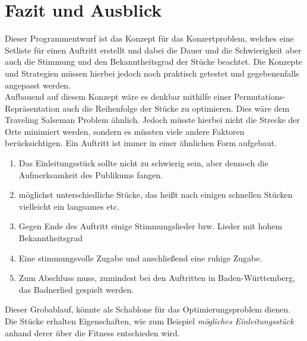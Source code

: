\section{Fazit und Ausblick}\label{sec:fazit}
Dieser Programmentwurf ist das Konzept für das Konzertproblem, welches 
eine Setliste für einen Auftritt erstellt und dabei die Dauer und die Schwierigkeit 
aber auch die Stimmung und den Bekanntheitsgrad der Stücke beachtet. 
Die Konzepte und Strategien müssen hierbei jedoch noch praktisch getestet und 
gegebenenfalls angepasst werden. \\
Aufbauend auf diesem Konzept wäre es denkbar mithilfe einer Permutations-Repräsentation 
auch die Reihenfolge der Stücke zu optimieren. Dies wäre dem Traveling Salseman Problem
ähnlich. Jedoch müsste hierbei nicht die Strecke der Orte minimiert werden, sondern es müssten 
viele andere Faktoren berücksichtigen. Ein Auftritt ist immer in einer ähnlichen Form 
aufgebaut.
\begin{enumerate}
    \item Das Einleitungsstück sollte nicht zu schwierig sein, aber dennoch die Aufmerksamkeit 
        des Publikums fangen.
    \item möglichst unterschiedliche Stücke, das heißt nach einigen schnellen Stücken vielleicht ein 
        langsames etc. 
    \item Gegen Ende des Auftritt einige Stimmungslieder bzw. Lieder mit hohem Bekanntheitsgrad
    \item Eine stimmungsvolle Zugabe und anschließend eine ruhige Zugabe. 
    \item Zum Abschluss muss, zumindest bei den Auftritten in Baden-Württemberg, das Badnerlied gespielt werden. 
\end{enumerate}

Dieser Grobablauf, könnte als Schablone für das Optimierungsproblem dienen. Die Stücke erhalten Eigenschaften, 
wie zum Beispiel \textit{mögliches Einleitungsstück} anhand derer über die Fitness entschieden wird. 


